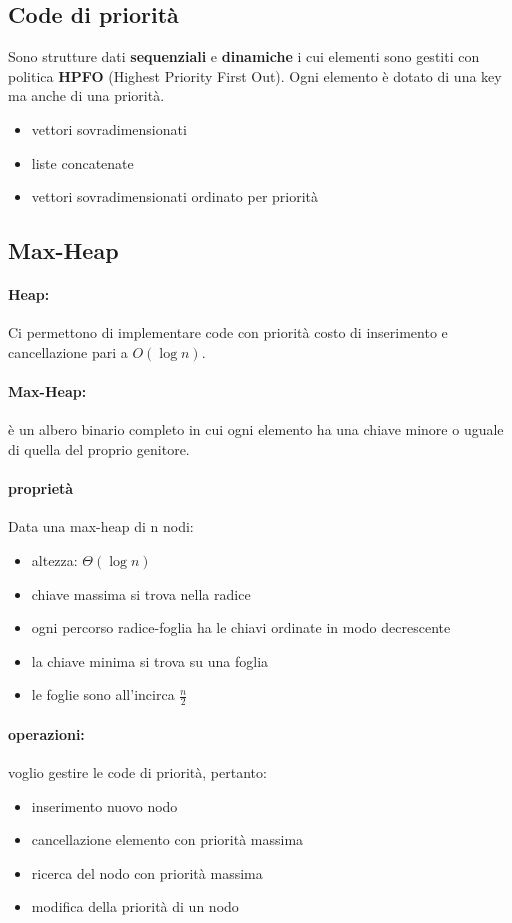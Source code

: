 \documentclass{article}
\begin{document}
\subsection{Code di priorità} %
Sono strutture dati \textbf{sequenziali} e \textbf{dinamiche} i cui elementi sono gestiti con politica \textbf{HPFO} (Highest Priority First Out).
 Ogni elemento è dotato di una key ma anche di una priorità.
\begin{itemize}
    \item vettori sovradimensionati
    \item liste concatenate
    \item vettori sovradimensionati ordinato per priorità
\end{itemize}

\subsection{Max-Heap} %
\paragraph{Heap:} Ci permettono di implementare code con priorità costo di inserimento e cancellazione pari a $O(\log n)$.

\paragraph{Max-Heap:} è un albero binario completo in cui ogni elemento ha una chiave minore o uguale di quella 
del proprio genitore.

\paragraph{proprietà} 
Data una max-heap di n nodi:
\begin{itemize}
    \item altezza: $\Theta(\log n)$
    \item chiave massima si trova nella radice
    \item ogni percorso radice-foglia ha le chiavi ordinate in modo decrescente
    \item la chiave minima si trova su una foglia
    \item le foglie sono all'incirca $\frac{n}{2}$
\end{itemize}

\paragraph{operazioni:}
voglio gestire le code di priorità, pertanto:
\begin{itemize}
    \item inserimento nuovo nodo
    \item cancellazione elemento con priorità massima
    \item ricerca del nodo con priorità massima
    \item modifica della priorità di un nodo
\end{itemize}
\end{document}
